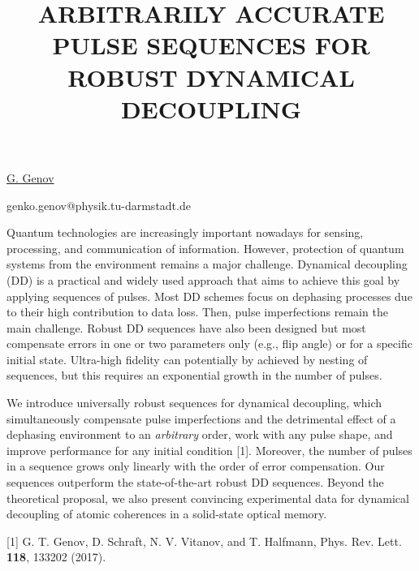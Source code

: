 \title{ARBITRARILY ACCURATE PULSE SEQUENCES FOR ROBUST DYNAMICAL DECOUPLING}

\underline{G. Genov} 

{\normalsize{\vspace{-4mm}
\darmstadt

\email genko.genov@physik.tu-darmstadt.de}}

Quantum technologies are increasingly important nowadays for sensing, processing, and communication of information. However, protection of quantum systems from the environment remains a major challenge. Dynamical decoupling (DD) is a practical and widely used approach that aims to achieve this goal by applying sequences of pulses. Most DD schemes focus on dephasing processes due to their high contribution to data loss. Then, pulse imperfections remain the main challenge. Robust DD sequences have also been designed but most compensate errors in one or two parameters only (e.g., flip angle) or for a specific initial state. Ultra-high fidelity can potentially by achieved by nesting of sequences, but this requires an exponential growth in the number of pulses.

We introduce universally robust sequences for dynamical decoupling, which simultaneously compensate pulse imperfections and the detrimental effect of a dephasing environment to an \emph{arbitrary} order, work with any pulse shape, and improve performance for any initial condition [1]. Moreover, the number of pulses in a sequence grows only linearly with the order of error compensation. Our sequences outperform the state-of-the-art robust DD sequences. Beyond the theoretical proposal, we also present convincing experimental data for dynamical decoupling of atomic coherences in a solid-state optical memory.

{\normalsize
[1] G. T. Genov, D. Schraft, N. V. Vitanov, and T. Halfmann, Phys. Rev. Lett. \textbf{118}, 133202 (2017).
}


\vspace{\baselineskip} 